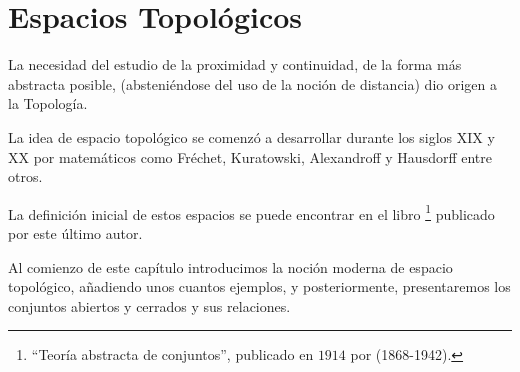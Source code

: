 

\chapter{Espacios Topológicos}
\label{etop}
La necesidad del estudio de la proximidad y continuidad, de la forma más abstracta posible, (absteniéndose del uso de la noción de distancia) dio origen a la Topología.

La idea de espacio topológico se comenzó a desarrollar durante los siglos XIX y XX por matemáticos como Fréchet, Kuratowski, Alexandroff y Hausdorff entre otros.

La definición inicial de estos espacios se puede encontrar en el libro \tb{}\footnote{``Teoría abstracta de conjuntos'', publicado en $1914$ por \tb{}(1868-1942).} publicado por este último autor.


Al comienzo de este capítulo introducimos la noción moderna de espacio topológico, añadiendo unos cuantos ejemplos, y posteriormente, presentaremos los conjuntos abiertos y cerrados y sus relaciones.%

